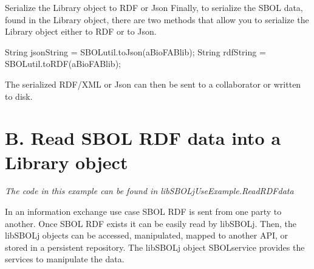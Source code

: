 \begin{DoxyEnumerate}
\item \begin{DoxyParagraph}{Serialize the Library object to RDF or Json}
Finally, to serialize the SBOL data, found in the Library object, there are two methods that allow you to serialize the Library object either to RDF or to Json. 
\begin{DoxyCode}
String jsonString = SBOLutil.toJson(aBioFABlib);
String rdfString = SBOLutil.toRDF(aBioFABlib);
\end{DoxyCode}

\end{DoxyParagraph}
The serialized RDF/XML or Json can then be sent to a collaborator or written to disk.
\end{DoxyEnumerate}



 \hypertarget{tutorial_B}{}\section{B. Read SBOL RDF data into a Library object}\label{tutorial_B}
{\itshape The code in this example can be found in libSBOLjUseExample.ReadRDFdata\/}

In an information exchange use case SBOL RDF is sent from one party to another. Once SBOL RDF exists it can be easily read by libSBOLj. Then, the libSBOLj objects can be accessed, manipulated, mapped to another API, or stored in a persistent repository. The libSBOLj object SBOLservice provides the services to manipulate the data.


